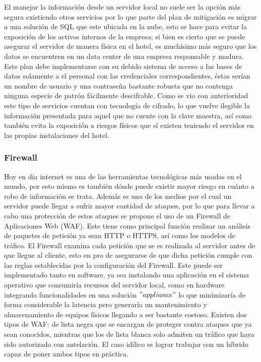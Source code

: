 \documentclass[10pt]{article}
\begin{document}
El manejar la información desde un servidor local no suele ser la opción más segura existiendo otros servicios por lo que parte del plan de mitigación es migrar a una solución de SQL que este ubicada en la nube, esto se hace para evitar la exposición de los activos internos de la empresa; si bien es cierto que se puede asegurar el servidor de manera física en el hotel, es muchísimo más seguro que los datos se encuentren en un data center de una empresa responsable y madura. Este plan debe implementarse con su debido sistema de acceso a las bases de datos solamente a el personal con las credenciales correspondientes, éstas serían un nombre de usuario y una contraseña bastante robusta que no contenga ninguna especie de patrón fácilmente descifrable. Como se vio con anterioridad este tipo de servicios cuentan con tecnología de cifrado, lo que vuelve ilegible la información presentada para aquel que no cuente con la clave maestra, así como también evita la exposición a riesgos físicos que sí existen teniendo el servidor en las propias instalaciones del hotel.\cite{ref8}

\subsubsection{Firewall}

Hoy en día internet es una de las herramientas tecnológicas más usadas en el mundo, por esto mismo es también dónde puede existir mayor riesgo en cuánto a robo de información se trata. Además es uno de los medios por el cual un servidor puede llegar a sufrir mayor cantidad de ataques, por lo que para llevar a cabo una protección de estos ataques se propone el uso de un Firewall de Aplicaciones Web (WAF). Este tiene como principal función realizar un análisis de paquetes de petición ya sean HTTP o HTTPS, así como los modelos de tráfico. El Firewall examina cada petición que se es realizada al servidor antes de que llegue al cliente, esto en pro de asegurarse de que dicha petición cumple con las reglas establecidas por la configuración del Firewall. Este puede ser implementado tanto en software, ya sea instalando una aplicación en el sistema operativo que consumiría recursos del servidor local, como en hardware integrando funcionalidades en una solución $"appliance"$ lo que minimizaría de forma considerable la latencia pero generaría un mantenimiento y almacenamiento de equipos físicos llegando a ser bastante costoso. Existen dos tipos de WAF: de lista negra que se encargan de proteger contra ataques que ya sean conocidos, mientras que los de lista blanca solo admiten un tráfico que haya sido autorizado con antelación. El caso idílico es lograr trabajar con un híbrido capaz de poner ambos tipos en práctica.\cite{ref7}
\end{document}
